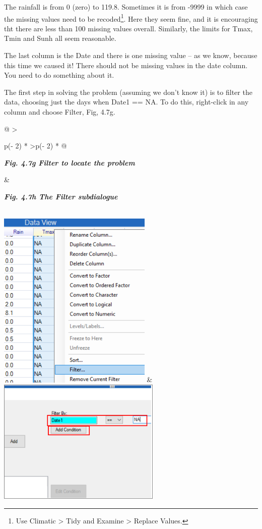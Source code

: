 \documentclass[
  letterpaper,
  DIV=11,
  numbers=noendperiod]{scrreprt}
\begin{document}
The rainfall is from 0 (zero) to 119.8. Sometimes it is from -9999 in
which case the missing values need to be recoded\footnote{Use Climatic
  \textgreater{} Tidy and Examine \textgreater{} Replace Values.}. Here
they seem fine, and it is encouraging tht there are less than 100
missing values overall. Similarly, the limits for Tmax, Tmin and Sunh
all seem reasonable.

The last column is the Date and there is one missing value -- as we
know, because this time we caused it! There should not be missing values
in the date column. You need to do something about it.

The first step in solving the problem (assuming we don't know it) is to
filter the data, choosing just the days when Date1 == NA. To do this,
right-click in any column and choose Filter, Fig, 4.7g.

\begin{longtable}[]{@{}
  >{\raggedright\arraybackslash}p{(\columnwidth - 2\tabcolsep) * }
  >{\centering\arraybackslash}p{(\columnwidth - 2\tabcolsep) * }@{}}
\toprule\noalign{}
\begin{minipage}[b]{\linewidth}\raggedright
\textbf{\emph{Fig. 4.7g Filter to locate the problem}}
\end{minipage} & \begin{minipage}[b]{\linewidth}\centering
\textbf{\emph{Fig. 4.7h The Filter subdialogue}}
\end{minipage} \\
\midrule\noalign{}
\endhead
\bottomrule\noalign{}
\endlastfoot
\includegraphics[width=2.90139in,height=3.37899in]{figures/Fig4.7g.png}
&
\includegraphics[width=3.08032in,height=2.35522in]{figures/Fig4.7h.png} \\
\end{longtable}
\end{document}
